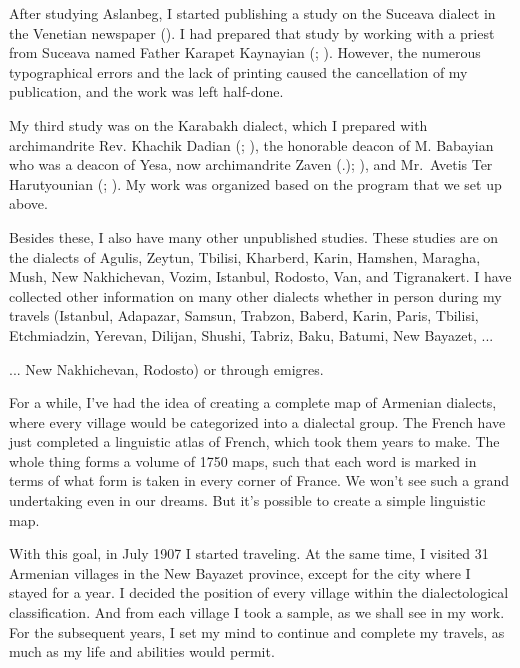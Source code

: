 After studying Aslanbeg, I started publishing a study on the Suceava dialect in the Venetian newspaper  (). I had prepared that study by working with a priest from Suceava named Father Karapet Kaynayian (; ). However, the numerous typographical errors and the lack of printing caused the cancellation of my publication, and the work was left half-done.

My third study was on the Karabakh dialect, which I prepared with archimandrite Rev. Khachik Dadian (; ), the honorable deacon of M. Babayian who was a deacon of Yesa, now archimandrite Zaven (.); ), and Mr.~Avetis Ter Harutyounian (; ). My work was organized based on the program that we set up above. 

Besides these, I also have many other unpublished studies. These studies are on the dialects of Agulis, Zeytun, Tbilisi, Kharberd, Karin, Hamshen, Maragha, Mush, New Nakhichevan, Vozim, Istanbul, Rodosto, Van, and Tigranakert. I have collected other information on many other dialects whether in person during my travels (Istanbul, Adapazar, Samsun, Trabzon, Baberd, Karin, Paris, Tbilisi, Etchmiadzin, Yerevan, Dilijan, Shushi, Tabriz, Baku, Batumi, New Bayazet, ... 


\begin{adjarianpage}\label{page:14}\end{adjarianpage}%

... New Nakhichevan, Rodosto) or through emigres. 

For a while, I've had the idea of creating a complete map of Armenian dialects, where every village would be categorized into a dialectal group. The French have just completed a linguistic atlas of French, which took them years to make. The whole thing forms a volume of 1750 maps, such that each word is marked in terms of what form is taken in every corner of France. We won't see such a grand undertaking even in our dreams. But it's possible to create a simple linguistic map.

With this goal, in July 1907 I started traveling. At the same time, I visited 31 Armenian villages in the New Bayazet province, except for the city where I stayed for a year. I decided the position of every village within the dialectological classification. And from each village I took a sample, as we shall see in my work. For the subsequent years, I set my mind to continue and complete my travels, as much as my life and abilities would permit. 

